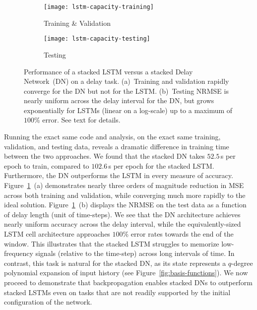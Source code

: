 \begin{figure}
  \centering
  \begin{subfigure}{.5\textwidth}
    \centering
    \texttt{[image: lstm-capacity-training]}
    \caption{Training \& Validation}
  \end{subfigure}%
  \begin{subfigure}{.5\textwidth}
    \centering
    \texttt{[image: lstm-capacity-testing]}
    \caption{Testing}
  \end{subfigure}
  \caption[Memory capacity of a stacked LSTM versus Delay Network.]{\label{fig:lstm-capacity}
    Performance of a stacked LSTM versus a stacked Delay Network~(DN) on a delay task.
    (a)~Training and validation rapidly converge for the DN but not for the LSTM.
    (b)~Testing NRMSE is nearly uniform across the delay interval for the DN, 
    but grows exponentially for LSTMs (linear on a log-scale) up to a maximum of $100$\% error.
    See text for details.
  }
\end{figure}


Running the exact same code and analysis, on the exact same training, validation, and testing data, reveals a dramatic difference in training time between the two approaches.
We found that the stacked DN takes $52.5$\,s per epoch to train, compared to $102.6$\,s per epoch for the stacked LSTM.
Furthermore, the DN outperforms the LSTM in every measure of accuracy.
Figure~\ref{fig:lstm-capacity}~(a) demonstrates nearly three orders of magnitude reduction in MSE across both training and validation, while converging much more rapidly to the ideal solution.
Figure~\ref{fig:lstm-capacity}~(b) displays the NRMSE on the test data as a function of delay length (unit of time-steps).
We see that the DN architecture achieves nearly uniform accuracy across the delay interval, while the equivalently-sized LSTM cell architecture approaches $100$\% error rates towards the end of the window.
This illustrates that the stacked LSTM struggles to memorize low-frequency signals (relative to the time-step) across long intervals of time.
In contrast, this task is natural for the stacked DN, as its state represents a $q$-degree polynomial expansion of input history (see Figure~\ref{fig:basis-functions}).
We now proceed to demonstrate that backpropagation enables stacked DNs to outperform stacked LSTMs even on tasks that are not readily supported by the initial configuration of the network.

